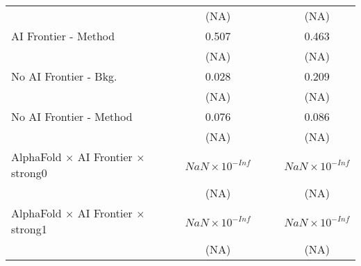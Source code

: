 \begin{tabular}{lcccccc}
                                                                              &                        &                        & (NA)                   &                        &                        & (NA)\\   
   AI Frontier - Method                                                       &                        &                        & 0.507                  &                        &                        & 0.463\\   
                                                                              &                        &                        & (NA)                   &                        &                        & (NA)\\   
   No AI Frontier - Bkg.                                                      &                        &                        & 0.028                  &                        &                        & 0.209\\   
                                                                              &                        &                        & (NA)                   &                        &                        & (NA)\\   
   No AI Frontier - Method                                                    &                        &                        & 0.076                  &                        &                        & 0.086\\   
                                                                              &                        &                        & (NA)                   &                        &                        & (NA)\\   
   AlphaFold $\times$ AI Frontier $\times$ strong0                            &                        &                        & $NaN\times 10^{-Inf}$  &                        &                        & $NaN\times 10^{-Inf}$\\    
                                                                              &                        &                        & (NA)                   &                        &                        & (NA)\\   
   AlphaFold $\times$ AI Frontier $\times$ strong1                            &                        &                        & $NaN\times 10^{-Inf}$  &                        &                        & $NaN\times 10^{-Inf}$\\    
                                                                              &                        &                        & (NA)                   &                        &                        & (NA)\\   

\end{tabular}
